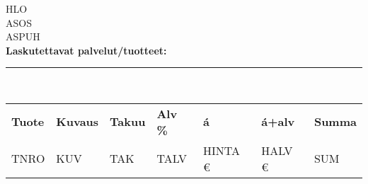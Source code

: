 \documentclass[10pt,a4paper]{minimal}
\begin{document}
	\noindent
	HLO \\
	ASOS \\
	ASPUH \vspace{1cm} \\ 
	\textbf{Laskutettavat palvelut/tuotteet:}\\
	\rule{19cm}{0.4pt}\vspace{0.5cm}\\
	\begin{tabularx}{\textwidth}{XXXXXXX}
		\textbf{Tuote} & \textbf{Kuvaus} & \textbf{Takuu} & \textbf{Alv \%}  & \textbf{á} & \textbf{á+alv} & \textbf{Summa}\\ 
		TNRO & KUV & TAK & TALV & HINTA \euro{} & HALV \euro{} & SUM \\ 
	\end{tabularx}
	 
\end{document}
